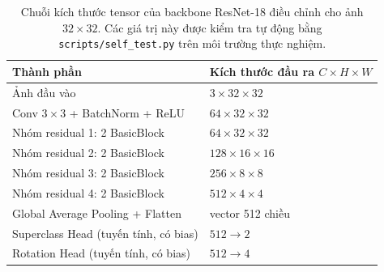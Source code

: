 \begin{table}[htbp]
  \centering
  \small
  \begin{tabular}{@{}l l@{}}
    \toprule
    Thành phần & Kích thước đầu ra $C \times H \times W$ \\
    \midrule
    Ảnh đầu vào & $3 \times 32 \times 32$ \\
    Conv $3\times3$ + BatchNorm + ReLU & $64 \times 32 \times 32$ \\
    Nhóm residual 1: 2 BasicBlock & $64 \times 32 \times 32$ \\
    Nhóm residual 2: 2 BasicBlock & $128 \times 16 \times 16$ \\
    Nhóm residual 3: 2 BasicBlock & $256 \times 8 \times 8$ \\
    Nhóm residual 4: 2 BasicBlock & $512 \times 4 \times 4$ \\
    Global Average Pooling + Flatten & vector 512 chiều \\
    Superclass Head (tuyến tính, có bias) & $512 \to 2$ \\
    Rotation Head (tuyến tính, có bias) & $512 \to 4$ \\
    \bottomrule
  \end{tabular}
  \caption{Chuỗi kích thước tensor của backbone ResNet-18 điều chỉnh cho ảnh $32 \times 32$. Các giá trị này được kiểm tra tự động bằng \texttt{scripts/self\_test.py} trên môi trường thực nghiệm.}
  \label{tab:arch}
\end{table}
